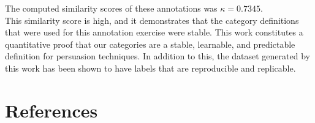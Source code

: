 \documentclass[letterpaper]{article}
\begin{document}
The computed similarity scores of these annotations was $\kappa = 0.7345$. \\

This similarity score is high, and it demonstrates that the category definitions that were used for this annotation exercise were stable. This work constitutes a quantitative proof that our categories are a stable, learnable, and predictable definition for persuasion techniques. In addition to this, the dataset generated by this work has been shown to have labels that are reproducible and replicable. 
\section{References}
\printbibliography
\end{document}
